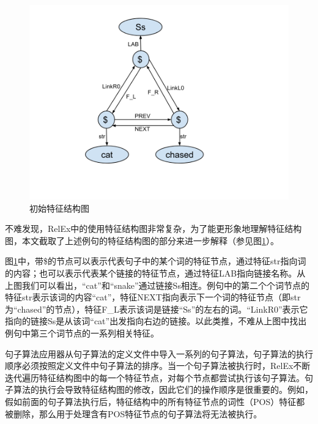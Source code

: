 \begin{figure}

\begin{centering}
\includegraphics[width=12cm]{figures/featureStructure.png} 
\par\end{centering}

\caption{初始特征结构图\label{fig:featureStructure}}


\end{figure}

不难发现，RelEx中的使用特征结构图非常复杂，为了能更形象地理解特征结构图，本文截取了上述例句的特征结构图的部分来进一步解释（参见图\ref{fig:featureStructure}）。
 
  图\ref{fig:featureStructure}中，带\$的节点可以表示代表句子中的某个词的特征节点，通过特征str指向词的内容；也可以表示代表某个链接的特征节点，通过特征LAB指向链接名称。从上图我们可以看出，“cat”和“snake”通过链接Ss相连。例句中的第二个个词节点的特征str表示该词的内容“cat”，特征NEXT指向表示下一个词的特征节点（即str为“chased”的节点），特征F\_L表示该词是链接“Ss”的左右的词。“LinkR0”表示它指向的链接Ss是从该词“cat”出发指向右边的链接。以此类推，不难从上图中找出例句中第三个词节点的一系列相关特征。


句子算法应用器从句子算法的定义文件中导入一系列的句子算法，句子算法的执行顺序必须按照定义文件中句子算法的排序。当一个句子算法被执行时，RelEx不断迭代遍历特征结构图中的每一个特征节点，对每个节点都尝试执行该句子算法。句子算法的执行会导致特征结构图的修改，因此它们的操作顺序是很重要的。例如，假如前面的句子算法执行后，特征结构中的所有特征节点的词性（POS）特征都被删除，那么用于处理含有POS特征节点的句子算法将无法被执行。

